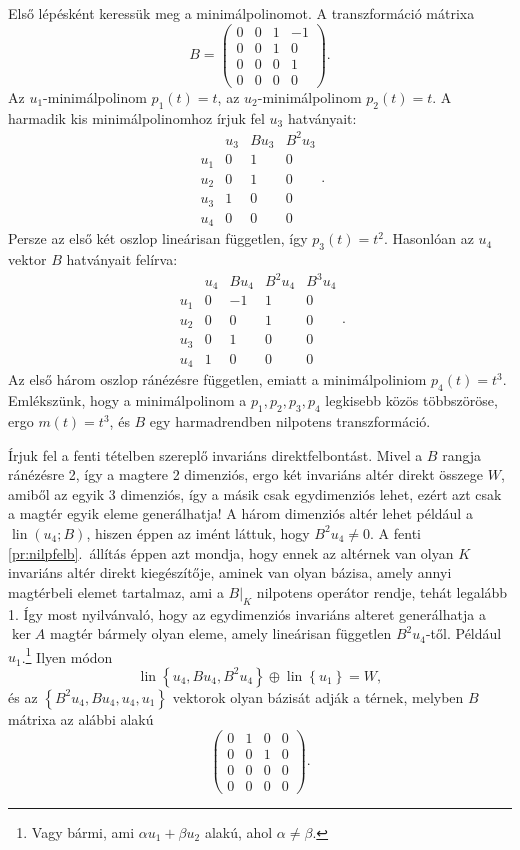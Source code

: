 \documentclass[a4paper, showtrims]{memoir}
\theoremstyle{plain}
\theoremstyle{remark}
\theoremstyle{definition}
\DeclareMathOperator{\lin}{lin}
\begin{document}
Első lépésként keressük meg a minimálpolinomot.
A transzformáció mátrixa
\[
	B=
	\begin{pmatrix}
		0 & 0 & 1 & -1 \\
		0 & 0 & 1 & 0  \\
		0 & 0 & 0 & 1  \\
		0 & 0 & 0 & 0
	\end{pmatrix}.
\]
Az $u_1$-minimálpolinom $p_1\left( t \right)=t$,
az $u_2$-minimálpolinom $p_2\left( t \right)=t$.
A harmadik kis minimálpolinomhoz írjuk fel $u_3$ hatványait:
\[
	\begin{array}{c|cccc}
		    & u_3 & Bu_3 & B^2u_3 \\
		\hline
		u_1 & 0   & 1    & 0      \\
		u_2 & 0   & 1    & 0      \\
		u_3 & 1   & 0    & 0      \\
		u_4 & 0   & 0    & 0
	\end{array}.
\]
Persze az első két oszlop lineárisan független, így $p_3\left( t \right)=t^2$.
Hasonlóan az $u_4$ vektor $B$ hatványait felírva:
\[
	\begin{array}{c|ccccc}
		    & u_4 & Bu_4 & B^2u_4 & B^3u_4 \\
		\hline
		u_1 & 0   & -1   & 1      & 0      \\
		u_2 & 0   & 0    & 1      & 0      \\
		u_3 & 0   & 1    & 0      & 0      \\
		u_4 & 1   & 0    & 0      & 0
	\end{array}.
\]
Az első három oszlop ránézésre független, emiatt a minimálpoliniom $p_4\left( t \right)=t^3$.
\\
Emlékszünk, hogy a minimálpolinom a $p_1,p_2,p_3,p_4$ legkisebb közös többszöröse,
ergo $m\left( t \right)=t^3$, és $B$ egy harmadrendben nilpotens transzformáció.

Írjuk fel a fenti tételben szereplő invariáns direktfelbontást.
Mivel a $B$ rangja ránézésre 2, így a magtere 2 dimenziós, ergo két invariáns altér direkt összege $W$, amiből
az egyik 3 dimenziós, így a másik csak egydimenziós lehet, ezért azt csak a magtér egyik eleme generálhatja!
A három dimenziós altér lehet például a $\lin(u_4;B)$,
hiszen éppen az imént láttuk, hogy $B^2u_4\neq 0$.
A fenti \ref{pr:nilpfelb}.~állítás éppen azt mondja, hogy ennek az altérnek van olyan $K$ invariáns altér direkt kiegészítője,
aminek van olyan bázisa, amely annyi magtérbeli elemet tartalmaz, ami a $B|_K$ nilpotens operátor rendje, tehát legalább 1.
Így most nyilvánvaló, hogy az
egydimenziós invariáns alteret generálhatja a $\ker A$ magtér bármely olyan eleme,
amely lineárisan független $B^2u_4$-től.
Például $u_1$.\footnote{Vagy bármi, ami $\alpha u_1+\beta u_2$ alakú, ahol $\alpha\neq\beta$.}
Ilyen módon
\[
	\lin\left\{ u_4,Bu_4,B^2u_4 \right\}\oplus
	\lin\left\{ u_1 \right\}
	=
	W,
\]
és az
\(
\left\{
B^2u_4,Bu_4,u_4,u_1
\right\}
\)
vektorok olyan bázisát adják a térnek, melyben $B$ mátrixa az alábbi alakú
\[
	\begin{pmatrix}
		0 & 1 & 0 & 0 \\
		0 & 0 & 1 & 0 \\
		0 & 0 & 0 & 0 \\
		0 & 0 & 0 & 0
	\end{pmatrix}.
\]
\end{document}
